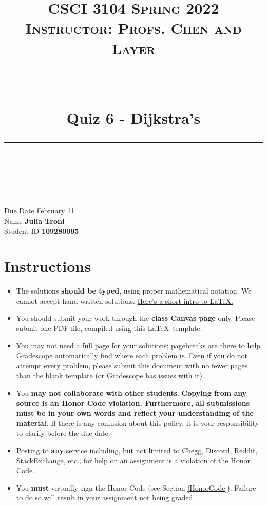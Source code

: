 \documentclass[11pt]{article}
\title{
\normalfont \normalsize 
\textsc{CSCI 3104 Spring 2022 \\ 
Instructor: Profs. Chen and Layer} \\
[10pt] 
\rule{\linewidth}{0.5pt} \\[6pt] 
\huge Quiz 6 - Dijkstra's \\
\rule{\linewidth}{2pt}  \\[10pt]
}
\date{}
\theoremstyle{definition}
\theoremstyle{definition}
\theoremstyle{definition}
\begin{document}
\maketitle


\noindent
Due Date \dotfill February 11 \\
Name \dotfill \textbf{Julia Troni} \\
Student ID \dotfill \textbf{109280095} \\


\tableofcontents

\section{Instructions}
 \begin{itemize}
	\item The solutions \textbf{should be typed}, using proper mathematical notation. We cannot accept hand-written solutions. \href{http://ece.uprm.edu/~caceros/latex/introduction.pdf}{Here's a short intro to \LaTeX.}
	\item You should submit your work through the \textbf{class Canvas page} only. Please submit one PDF file, compiled using this \LaTeX \ template.
	\item You may not need a full page for your solutions; pagebreaks are there to help Gradescope automatically find where each problem is. Even if you do not attempt every problem, please submit this document with no fewer pages than the blank template (or Gradescope has issues with it).

	\item You \textbf{may not collaborate with other students}. \textbf{Copying from any source is an Honor Code violation. Furthermore, all submissions must be in your own words and reflect your understanding of the material.} If there is any confusion about this policy, it is your responsibility to clarify before the due date. 

	\item Posting to \textbf{any} service including, but not limited to Chegg, Discord, Reddit, StackExchange, etc., for help on an assignment is a violation of the Honor Code.

	\item You \textbf{must} virtually sign the Honor Code (see Section \ref{HonorCode}). Failure to do so will result in your assignment not being graded.
\end{itemize}
\end{document}

